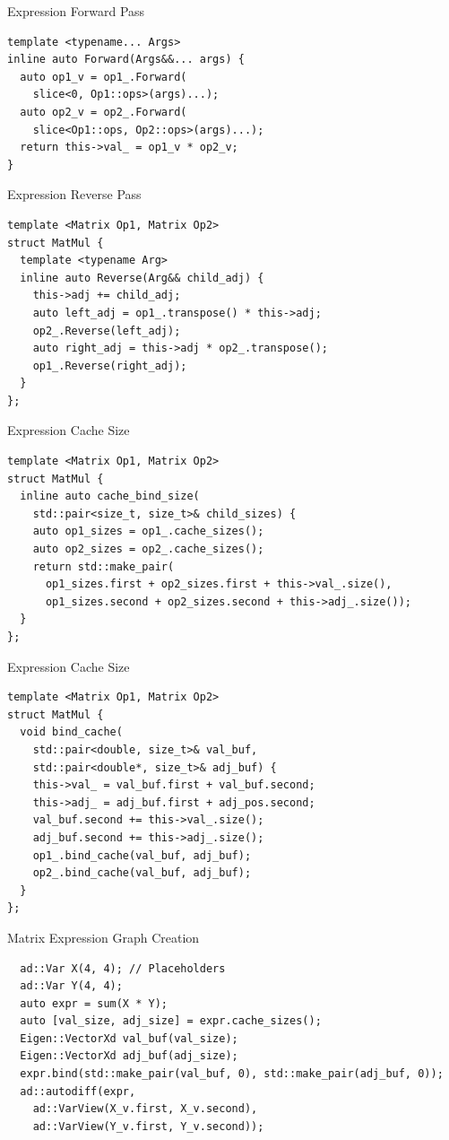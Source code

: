 \documentclass[dvipsnames, aspectratio=169]{beamer}
\begin{document}
\begin{frame}[fragile]{Expression Forward Pass}
\begin{verbatim}
template <typename... Args>
inline auto Forward(Args&&... args) {
  auto op1_v = op1_.Forward(
    slice<0, Op1::ops>(args)...);
  auto op2_v = op2_.Forward(
    slice<Op1::ops, Op2::ops>(args)...);
  return this->val_ = op1_v * op2_v;
}
\end{verbatim}
\end{frame}

\begin{frame}[fragile]{Expression Reverse Pass}
\begin{verbatim}
template <Matrix Op1, Matrix Op2>
struct MatMul {
  template <typename Arg>
  inline auto Reverse(Arg&& child_adj) {
    this->adj += child_adj;
    auto left_adj = op1_.transpose() * this->adj;
    op2_.Reverse(left_adj);
    auto right_adj = this->adj * op2_.transpose();
    op1_.Reverse(right_adj);
  }
};
\end{verbatim}
\end{frame}

\begin{frame}[fragile]{Expression Cache Size}
\begin{verbatim}
template <Matrix Op1, Matrix Op2>
struct MatMul {
  inline auto cache_bind_size(
    std::pair<size_t, size_t>& child_sizes) {
    auto op1_sizes = op1_.cache_sizes();
    auto op2_sizes = op2_.cache_sizes();
    return std::make_pair(
      op1_sizes.first + op2_sizes.first + this->val_.size(),
      op1_sizes.second + op2_sizes.second + this->adj_.size());
  }
};
\end{verbatim}
\end{frame}

\begin{frame}[fragile]{Expression Cache Size}
\begin{verbatim}
template <Matrix Op1, Matrix Op2>
struct MatMul {
  void bind_cache(
    std::pair<double, size_t>& val_buf, 
    std::pair<double*, size_t>& adj_buf) {
    this->val_ = val_buf.first + val_buf.second;
    this->adj_ = adj_buf.first + adj_pos.second;
    val_buf.second += this->val_.size();
    adj_buf.second += this->adj_.size();
    op1_.bind_cache(val_buf, adj_buf);
    op2_.bind_cache(val_buf, adj_buf);
  }
};
\end{verbatim}
\end{frame}

\begin{frame}[fragile]{Matrix Expression Graph Creation}
\begin{verbatim}
  ad::Var X(4, 4); // Placeholders
  ad::Var Y(4, 4);
  auto expr = sum(X * Y);
  auto [val_size, adj_size] = expr.cache_sizes(); 
  Eigen::VectorXd val_buf(val_size);
  Eigen::VectorXd adj_buf(adj_size);
  expr.bind(std::make_pair(val_buf, 0), std::make_pair(adj_buf, 0));
  ad::autodiff(expr, 
    ad::VarView(X_v.first, X_v.second), 
    ad::VarView(Y_v.first, Y_v.second));
\end{verbatim}
\end{frame}
\end{document}
